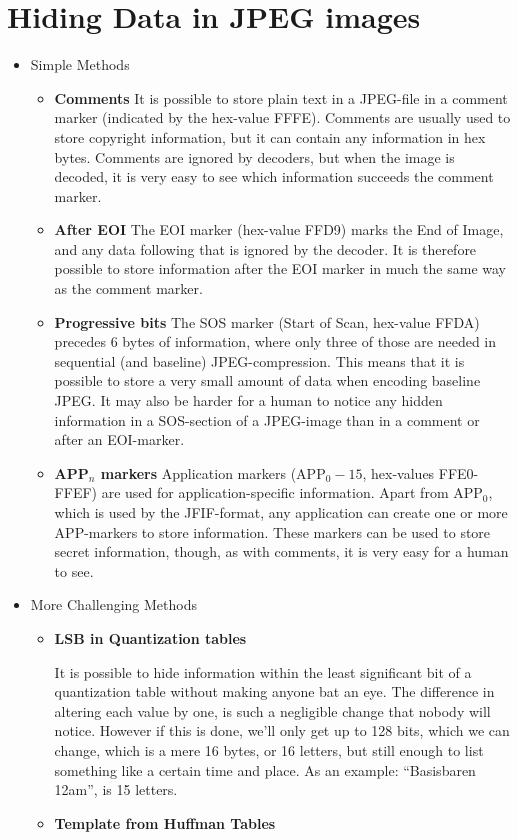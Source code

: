 
\section{Hiding Data in JPEG images}

\begin{itemize}
	\item Simple Methods
	\begin{itemize}
		\item \textbf{Comments}
		It is possible to store plain text in a JPEG-file in a comment marker (indicated by the hex-value FFFE).
		Comments are usually used to store copyright information, but it can contain any information in hex bytes.
		Comments are ignored by decoders, but when the image is decoded, it is very easy to see which information succeeds the comment marker.

		\item \textbf{After EOI}
		The EOI marker (hex-value FFD9) marks the End of Image, and any data following that is ignored by the decoder.
		It is therefore possible to store information after the EOI marker in much the same way as the comment marker.

		\item \textbf{Progressive bits}
		The SOS marker (Start of Scan, hex-value FFDA) precedes 6 bytes of information, where only three of those are needed in sequential (and baseline) JPEG-compression.
		This means that it is possible to store a very small amount of data when encoding baseline JPEG.
		It may also be harder for a human to notice any hidden information in a SOS-section of a JPEG-image than in a comment or after an EOI-marker.

		\item \textbf{APP$_n$ markers}
		Application markers (APP$_0-15$, hex-values FFE0-FFEF) are used for application-specific information.
		Apart from APP$_0$, which is used by the JFIF-format, any application can create one or more APP-markers to store information.
		These markers can be used to store secret information, though, as with comments, it is very easy for a human to see.
	\end{itemize}
	\item More Challenging Methods
	\begin{itemize}
		\item \textbf{LSB in Quantization tables}

		It is possible to hide information within the least significant bit of a quantization table without making anyone bat an eye.
		The difference in altering each value by one, is such a negligible change that nobody will notice.
		However if this is done, we'll only get up to 128 bits, which we can change, which is a mere 16 bytes, or 16 letters, but still enough to list something like a certain time and place.
		As an example: ``Basisbaren 12am'', is 15 letters.
		\item \textbf{Template from Huffman Tables}


\end{itemize}
\end{itemize}

